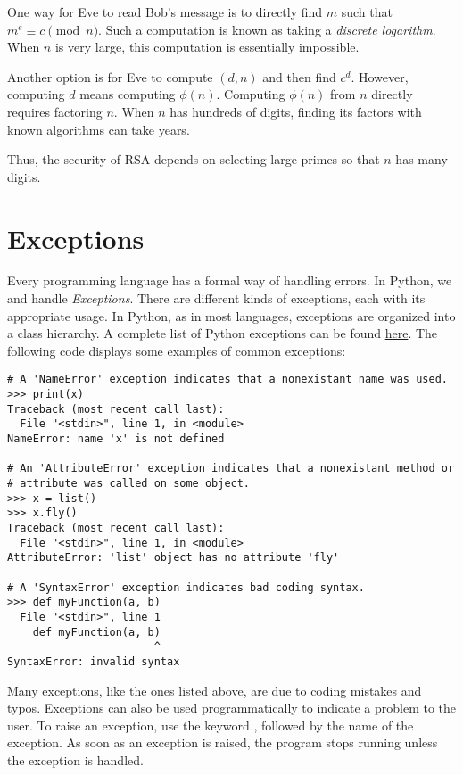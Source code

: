 One way for Eve to read Bob's message is to directly find $m$ such that $m^e \equiv c \pmod{n}$.
Such a computation is known as taking a \emph{discrete logarithm}.
When $n$ is very large, this computation is essentially impossible.

Another option is for Eve to compute $(d, n)$ and then find $c^d$.
However, computing $d$ means computing $\phi(n)$.
Computing $\phi(n)$ from $n$ directly requires factoring $n$.
When $n$ has hundreds of digits, finding its factors with known algorithms can take years.

Thus, the security of RSA depends on selecting large primes so that $n$ has many digits.

\section*{Exceptions}

Every programming language has a formal way of handling errors.
In Python, we  and handle \emph{Exceptions}.
There are different kinds of exceptions, each with its appropriate usage.
In Python, as in most languages, exceptions are organized into a class hierarchy.
A complete list of Python exceptions can be found \href{https://docs.python.org/2/library/exceptions.html}{here}.
The following code displays some examples of common exceptions:

\begin{lstlisting}
# A 'NameError' exception indicates that a nonexistant name was used.
>>> print(x)
Traceback (most recent call last):
  File "<stdin>", line 1, in <module>
NameError: name 'x' is not defined

# An 'AttributeError' exception indicates that a nonexistant method or
# attribute was called on some object.
>>> x = list()
>>> x.fly()
Traceback (most recent call last):
  File "<stdin>", line 1, in <module>
AttributeError: 'list' object has no attribute 'fly'

# A 'SyntaxError' exception indicates bad coding syntax.
>>> def myFunction(a, b)
  File "<stdin>", line 1
    def myFunction(a, b)
                       ^
SyntaxError: invalid syntax
\end{lstlisting}

Many exceptions, like the ones listed above, are due to coding mistakes and typos.
Exceptions can also be used programmatically to indicate a problem to the user.
To raise an exception, use the keyword , followed by the name of the exception.
As soon as an exception is raised, the program stops running unless the exception is handled.

